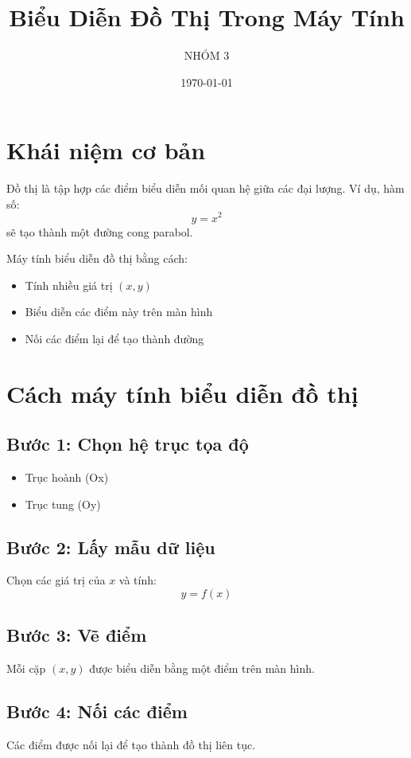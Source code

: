 \documentclass{beamer}
\title{Biểu Diễn Đồ Thị Trong Máy Tính}
\author{NHÓM 3}
\date{\today}
\begin{document}
\maketitle

\section{Khái niệm cơ bản}
Đồ thị là tập hợp các điểm biểu diễn mối quan hệ giữa các đại lượng. 
Ví dụ, hàm số:
\[
y = x^2
\]
sẽ tạo thành một đường cong parabol.

Máy tính biểu diễn đồ thị bằng cách:
\begin{itemize}
    \item Tính nhiều giá trị $(x, y)$
    \item Biểu diễn các điểm này trên màn hình
    \item Nối các điểm lại để tạo thành đường
\end{itemize}

\section{Cách máy tính biểu diễn đồ thị}

\subsection*{Bước 1: Chọn hệ trục tọa độ}
\begin{itemize}
    \item Trục hoành (Ox)
    \item Trục tung (Oy)
\end{itemize}

\subsection*{Bước 2: Lấy mẫu dữ liệu}
Chọn các giá trị của $x$ và tính:
\[
y = f(x)
\]

\subsection*{Bước 3: Vẽ điểm}
Mỗi cặp $(x, y)$ được biểu diễn bằng một điểm trên màn hình.

\subsection*{Bước 4: Nối các điểm}
Các điểm được nối lại để tạo thành đồ thị liên tục.
\end{document}
